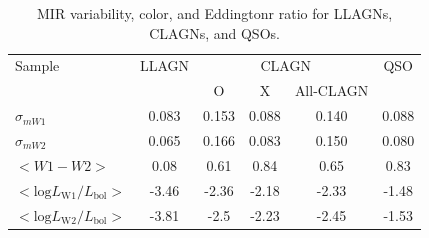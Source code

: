 \documentclass[linenumbers]{aastex631}
\begin{document}
\begin{table}
 \caption{MIR variability, color, and Eddingtonr ratio for LLAGNs, CLAGNs, and QSOs.
}
 \label{table_MIR_var_cor_lum}
 \begin{center}
 \begin{tabular}{lccccc}
 \hline\hline
Sample             & LLAGN &   \multicolumn{3}{c}{CLAGN}        & QSO  \\ 
                   &        &   O & X   & All-CLAGN         &       \\ \hline
$\sigma_{m W1}$    &  0.083      & 0.153    &  0.088  &   0.140   &   0.088  \\ 
$\sigma_{m W2}$    &  0.065      &   0.166 &  0.083   &    0.150  &   0.080    \\ 
$<W1-W2>$          &   0.08      &  0.61   & 0.84      &    0.65    &   0.83   \\ 
$<\mathrm{log} L_\mathrm{W1}/L_\mathrm{bol}>$ & -3.46  &  -2.36  &  -2.18   &  -2.33   &  -1.48\\ 
$<\mathrm{log} L_\mathrm{W2}/L_\mathrm{bol}>$ & -3.81  &   -2.5   &  -2.23   &  -2.45   &   -1.53  \\ 
\hline\hline
\end{tabular}
\end{center}
\end{table}
\end{document}
